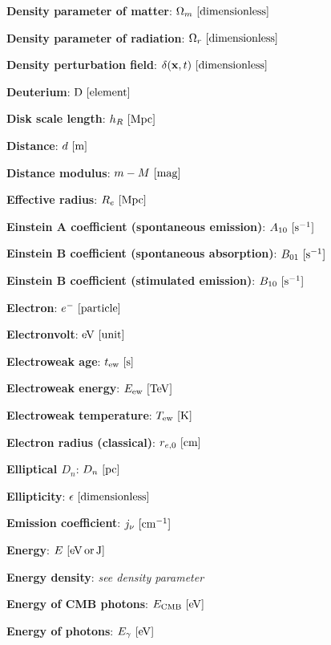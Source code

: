 \documentclass[a4paper,11pt]{article}
\begin{document}
{\noindent}\textbf{Density parameter of matter}: $\Omega_m ~ [{\rm dimensionless}]$

{\noindent}\textbf{Density parameter of radiation}: $\Omega_r ~ [{\rm dimensionless}]$

{\noindent}\textbf{Density perturbation field}: $\delta(\mathbf{x},t) ~ [{\rm dimensionless}]$

{\noindent}\textbf{Deuterium}: ${\rm D} ~ [{\rm element}]$

{\noindent}\textbf{Disk scale length}: $h_R ~ [{\rm Mpc}]$

{\noindent}\textbf{Distance}: $d ~ [{\rm m}]$

{\noindent}\textbf{Distance modulus}: $m - M ~ [{\rm mag}]$

{\noindent}\textbf{Effective radius}: $R_e ~ [{\rm Mpc}]$

{\noindent}\textbf{Einstein A coefficient (spontaneous emission)}: $A_{10} ~ [{\rm s^{-1}}]$

{\noindent}\textbf{Einstein B coefficient (spontaneous absorption)}: $B_{01} ~ [{\rm s^{-1}}]$

{\noindent}\textbf{Einstein B coefficient (stimulated emission)}: $B_{10} ~ [{\rm s^{-1}}]$

{\noindent}\textbf{Electron}: $e^- ~ [{\rm particle}]$

{\noindent}\textbf{Electronvolt}: ${\rm eV} ~ [{\rm unit}]$

{\noindent}\textbf{Electroweak age}: $t_\mathrm{ew} ~ [{\rm s}]$

{\noindent}\textbf{Electroweak energy}: $E_\mathrm{ew} ~ [{\rm TeV}]$

{\noindent}\textbf{Electroweak temperature}: $T_\mathrm{ew} ~ [{\rm K}]$

{\noindent}\textbf{Electron radius (classical)}: $r_{e,0} ~ [{\rm cm}]$

{\noindent}\textbf{Elliptical $D_n$}: $D_n ~ [{\rm pc}]$

{\noindent}\textbf{Ellipticity}: $\epsilon ~ [{\rm dimensionless}]$

{\noindent}\textbf{Emission coefficient}: $j_\nu ~ [{\rm cm^{-1}}]$

{\noindent}\textbf{Energy}: $E ~ [{\rm eV\,or\,J}]$

{\noindent}\textbf{Energy density}: \textit{see density parameter}

{\noindent}\textbf{Energy of CMB photons}: $E_\mathrm{CMB} ~ [{\rm eV}]$

{\noindent}\textbf{Energy of photons}: $E_\gamma ~ [{\rm eV}]$
\end{document}
